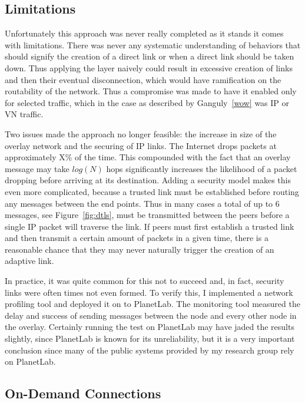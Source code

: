 \subsection{Limitations}

Unfortunately this approach was never really completed as it stands it comes
with limitations.  There was never any systematic understanding of behaviors
that should signify the creation of a direct link or when a direct link should
be taken down.  Thus applying the layer naively could result in excessive
creation of links and then their eventual disconnection, which would have
ramification on the routability of the network.  Thus a compromise was made to
have it enabled only for selected traffic, which in the case as described by
Ganguly~\ref{wow} was IP or VN traffic.

Two issues made the approach no longer feasible:  the increase in size of the
overlay network and the securing of IP links.  The Internet drops packets at
approximately X\% of the time.  This compounded with the fact that an overlay
message may take $log(N)$ hops significantly increases the likelihood of a
packet dropping before arriving at its destination.  Adding a security model
makes this even more complicated, because a trusted link must be established
before routing any messages between the end points.  Thus in many cases a total
of up to 6 messages, see Figure~\ref{fig:dtls}, must be transmitted between the
peers before a single IP packet will traverse the link.  If peers must first
establish a trusted link and then transmit a certain amount of packets in a
given time, there is a reasonable chance that they may never naturally trigger
the creation of an adaptive link.

In practice, it was quite common for this not to succeed and, in fact, security
links were often times not even formed.  To verify this, I implemented a
network profiling tool and deployed it on to PlanetLab.  The monitoring tool
measured the delay and success of sending messages between the node and every
other node in the overlay.  Certainly running the test on PlanetLab may have
jaded the results slightly, since PlanetLab is known for its unreliability, but
it is a very important conclusion since many of the public systems provided by
my research group rely on PlanetLab.

\subsection{On-Demand Connections}

